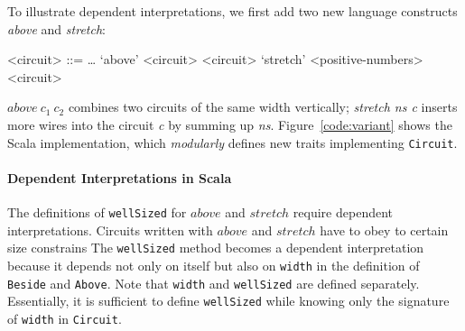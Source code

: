 
To illustrate dependent interpretations, we first add two new language 
constructs \emph{above} and \emph{stretch}:
\setlength{\grammarindent}{5em} %
\begin{grammar}
<circuit> ::= \ldots
\alt `above' <circuit> <circuit>
\alt `stretch' <positive-numbers> <circuit>
\end{grammar}
$above\ c_1\ c_2$ combines two circuits of the same width vertically;
\emph{stretch ns c} inserts more wires into the circuit \emph{c} by
summing up \emph{ns}.
Figure~\ref{code:variant} shows the Scala implementation, which
\emph{modularly} defines new traits implementing \lstinline{Circuit}.



\paragraph{Dependent Interpretations in Scala}
The definitions of \lstinline{wellSized} for $above$ and $stretch$
require dependent interpretations.
Circuits written with $above$ and $stretch$ have to obey to certain
size constrains%
The \lstinline{wellSized} method becomes a dependent interpretation
because it depends not only on itself but also on \lstinline{width} in the
definition of \lstinline{Beside} and \lstinline{Above}.
Note that \lstinline{width} and \lstinline{wellSized} are defined separately.
Essentially, it is sufficient to define \lstinline{wellSized} while
knowing only the signature of \lstinline{width} in \lstinline{Circuit}.

